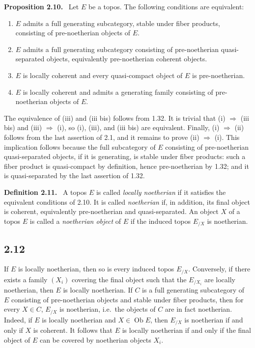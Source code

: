 \documentclass[11pt]{article}
\newcommand{\Ob}{\operatorname{Ob}}
\newcommand{\ie}{i.e.\ }
\newenvironment{statement}[1]{\par\medskip\noindent\textbf{#1.}\ }{\par\medskip}
\begin{document}
\begin{statement}{Proposition 2.10}
Let \(E\) be a topos. The following conditions are equivalent:
\begin{enumerate}[label=(\roman*)]
\item \(E\) admits a full generating subcategory, stable under fiber products, consisting of pre-noetherian objects of \(E\).
\item \(E\) admits a full generating subcategory consisting of pre-noetherian quasi-separated objects, equivalently pre-noetherian coherent objects.
\item \(E\) is locally coherent and every quasi-compact object of \(E\) is pre-noetherian.
\item[(iii bis)] \(E\) is locally coherent and admits a generating family consisting of pre-noetherian objects of \(E\).
\end{enumerate}
\end{statement}

The equivalence of (iii) and (iii bis) follows from 1.32. It is trivial that (i) \(\Rightarrow\) (iii bis) and (iii) \(\Rightarrow\) (i), so (i), (iii), and (iii bis) are equivalent. Finally, (i) \(\Rightarrow\) (ii) follows from the last assertion of 2.1, and it remains to prove (ii) \(\Rightarrow\) (i). This implication follows because the full subcategory of \(E\) consisting of pre-noetherian quasi-separated objects, if it is generating, is stable under fiber products: such a fiber product is quasi-compact by definition, hence pre-noetherian by 1.32; and it is quasi-separated by the last assertion of 1.32.

\begin{statement}{Definition 2.11}
A topos \(E\) is called \emph{locally noetherian} if it satisfies the equivalent conditions of 2.10. It is called \emph{noetherian} if, in addition, its final object is coherent, equivalently pre-noetherian and quasi-separated. An object \(X\) of a topos \(E\) is called a \emph{noetherian object} of \(E\) if the induced topos \(E_{/X}\) is noetherian.
\end{statement}

\subsection*{2.12}
If \(E\) is locally noetherian, then so is every induced topos \(E_{/X}\). Conversely, if there exists a family \((X_i)\) covering the final object such that the \(E_{/X_i}\) are locally noetherian, then \(E\) is locally noetherian. If \(C\) is a full generating subcategory of \(E\) consisting of pre-noetherian objects and stable under fiber products, then for every \(X\in C\), \(E_{/X}\) is noetherian, \ie the objects of \(C\) are in fact noetherian. Indeed, if \(E\) is locally noetherian and \(X\in\Ob E\), then \(E_{/X}\) is noetherian if and only if \(X\) is coherent. It follows that \(E\) is locally noetherian if and only if the final object of \(E\) can be covered by noetherian objects \(X_i\).
\end{document}

